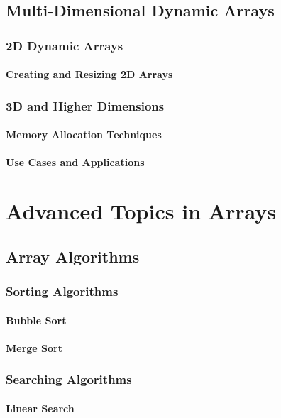 \documentclass[12pt, oneside]{book}
\begin{document}
	\section{Multi-Dimensional Dynamic Arrays}
	\subsection{2D Dynamic Arrays}
	\subsubsection{Creating and Resizing 2D Arrays}
	\subsection{3D and Higher Dimensions}
	\subsubsection{Memory Allocation Techniques}
	\subsubsection{Use Cases and Applications}
	
	\chapter{Advanced Topics in Arrays}
	
	\section{Array Algorithms}
	\subsection{Sorting Algorithms}
	\subsubsection{Bubble Sort}
	\subsubsection{Merge Sort}
	\subsection{Searching Algorithms}
	\subsubsection{Linear Search}
\end{document}
